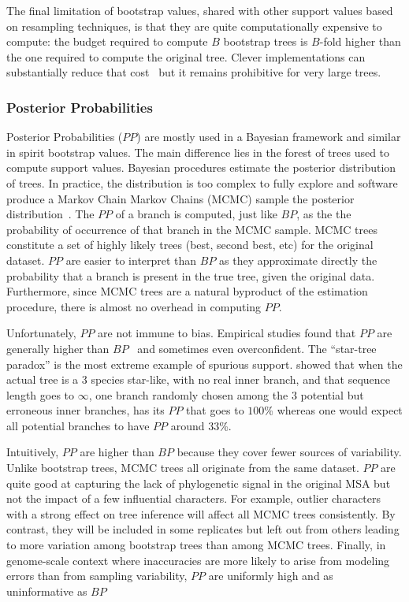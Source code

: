 The final limitation of bootstrap values, shared with other support values based on resampling techniques, is that they are quite computationally expensive to compute: the budget required to compute $B$ bootstrap trees is $B$-fold higher than the one required to compute the original tree. Clever implementations can substantially reduce that cost~\citep{Stamatakis2014} but it remains prohibitive for very large trees. 

\subsubsection{Posterior Probabilities} \label{sec:posterior-probabilities}

Posterior Probabilities ($PP$) are mostly used in a Bayesian framework and similar in spirit bootstrap values. The main difference lies in the forest of trees used to compute support values. Bayesian procedures estimate the posterior distribution of trees. In practice, the distribution is too complex to fully explore and software produce a Markov Chain Markov Chains (MCMC) sample the posterior distribution~\citep{Yang1997a}. The $PP$ of a branch is computed, just like $BP$, as the the probability of occurrence of that branch in the MCMC sample. MCMC trees constitute a set of highly likely trees (best, second best, etc) for the original dataset. $PP$ are easier to interpret than $BP$ as they approximate directly the probability that a branch is present in the true tree, given the original data. Furthermore, since MCMC trees are a natural byproduct of the estimation procedure, there is almost no overhead in computing $PP$. 

Unfortunately, $PP$ are not immune to bias. Empirical studies found that $PP$ are generally higher than $BP$~\citep{Anisimova2011} and sometimes even overconfident. The ``star-tree paradox'' \citep{Yang2007} is the most extreme example of spurious support. \citet{Yang2007} showed that when the actual tree is a 3 species star-like, with no real inner branch, and that sequence length goes to $\infty$, one branch randomly chosen among the 3 potential but erroneous inner branches, has its $PP$ that goes to $100$\% whereas one would expect all potential branches to have $PP$ around $33$\%. 

Intuitively, $PP$ are higher than $BP$ because they cover fewer sources of variability. Unlike bootstrap trees, MCMC trees all originate from the same dataset. $PP$ are quite good at capturing the lack of phylogenetic signal in the original MSA but not the impact of a few influential characters. For example, outlier characters with a strong effect on tree inference will affect all MCMC trees consistently. By contrast, they will be included in some replicates but left out from others leading to more variation among bootstrap trees than among MCMC trees. Finally, in genome-scale context where inaccuracies are more likely to arise from modeling errors than from sampling variability, $PP$ are uniformly high and as uninformative as $BP$~\citep{Philippe2011, Kumar2012}

